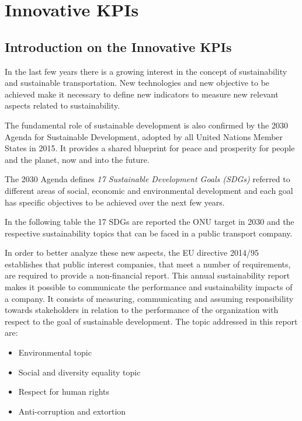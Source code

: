 \chapter{Innovative KPIs}
\label{ch:Innovative}
\section{Introduction on the Innovative KPIs}
\label{sec:Intro_Innvovative}
In the last few years there is a growing interest in the concept of sustainability and sustainable transportation. New technologies and new objective to be achieved make it necessary to define new indicators to measure new relevant aspects related to sustainability.

The fundamental role of sustainable development is also confirmed by the 2030 Agenda for Sustainable Development, adopted by all United Nations Member States in 2015. It provides a shared blueprint for peace and prosperity for people and the planet, now and into the future. 

The 2030 Agenda defines \emph{17 Sustainable Development Goals (SDGs)}\cite{sdgs} referred to different areas of social, economic and environmental development and each goal has specific objectives to be achieved over the next few years. 

In the following table the 17 SDGs are reported the ONU target in 2030 and the respective sustainability topics that can be faced in a public transport company.



In order to better analyze these new aspects, the EU directive 2014/95\cite{directive201495eu} establishes that public interest companies, that meet a number of requirements, are required to provide a non-financial report. This annual sustainability report makes it possible to communicate the performance and sustainability impacts of a company. It consists of measuring, communicating and assuming responsibility towards stakeholders in relation to the performance of the organization with respect to the goal of sustainable development. The topic addressed in this report are:

\begin{itemize}
    \item Environmental topic
    \item Social and diversity equality topic
    \item Respect for human rights
    \item Anti-corruption and extortion
\end{itemize}

